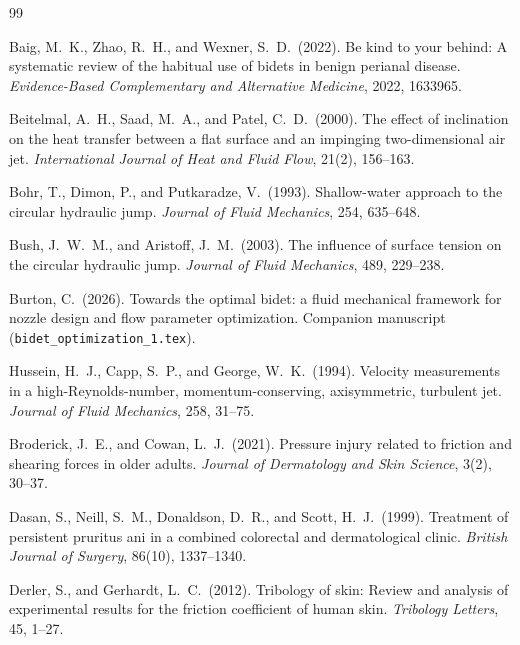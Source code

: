 \documentclass[aps,prfluids,reprint,amsmath,amssymb,floatfix]{revtex4-2}
\begin{document}
\begin{thebibliography}{99}

Baig, M.~K., Zhao, R.~H., and Wexner, S.~D.\ (2022).
Be kind to your behind: A systematic review of the habitual use of bidets
in benign perianal disease.
\textit{Evidence-Based Complementary and Alternative Medicine}, 2022, 1633965.

Beitelmal, A.~H., Saad, M.~A., and Patel, C.~D.\ (2000).
The effect of inclination on the heat transfer between a flat surface
and an impinging two-dimensional air jet.
\textit{International Journal of Heat and Fluid Flow}, 21(2), 156--163.

Bohr, T., Dimon, P., and Putkaradze, V.\ (1993).
Shallow-water approach to the circular hydraulic jump.
\textit{Journal of Fluid Mechanics}, 254, 635--648.

Bush, J.~W.~M., and Aristoff, J.~M.\ (2003).
The influence of surface tension on the circular hydraulic jump.
\textit{Journal of Fluid Mechanics}, 489, 229--238.

Burton, C.\ (2026).
Towards the optimal bidet: a fluid mechanical framework for nozzle
design and flow parameter optimization.
Companion manuscript (\texttt{bidet\_optimization\_1.tex}).

Hussein, H.~J., Capp, S.~P., and George, W.~K.\ (1994).
Velocity measurements in a high-Reynolds-number, momentum-conserving,
axisymmetric, turbulent jet.
\textit{Journal of Fluid Mechanics}, 258, 31--75.

Broderick, J.~E., and Cowan, L.~J.\ (2021).
Pressure injury related to friction and shearing forces in older adults.
\textit{Journal of Dermatology and Skin Science}, 3(2), 30--37.

Dasan, S., Neill, S.~M., Donaldson, D.~R., and Scott, H.~J.\ (1999).
Treatment of persistent pruritus ani in a combined colorectal and
dermatological clinic.
\textit{British Journal of Surgery}, 86(10), 1337--1340.

Derler, S., and Gerhardt, L.~C.\ (2012).
Tribology of skin: Review and analysis of experimental results for the
friction coefficient of human skin.
\textit{Tribology Letters}, 45, 1--27.


\end{thebibliography}
\end{document}
